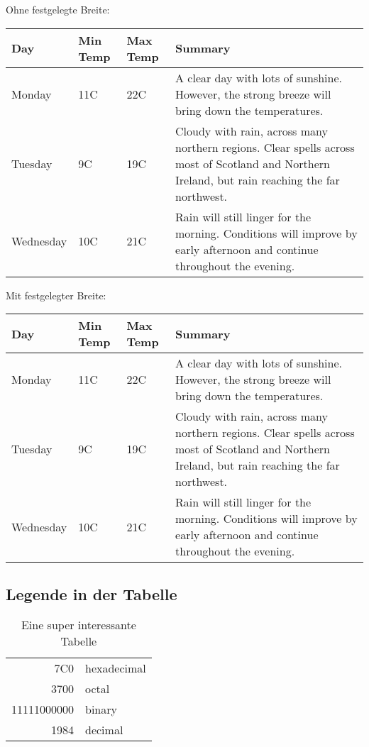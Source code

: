 \documentclass[a4paper,10pt]{scrartcl}
\begin{document}
Ohne festgelegte Breite:
\begin{center}
    \begin{tabular}{| l | l | l | l |}
    \hline
    Day & Min Temp & Max Temp & Summary \\ \hline
    Monday & 11C & 22C & A clear day with lots of sunshine.
    However, the strong breeze will bring down the temperatures. \\ \hline
    Tuesday & 9C & 19C & Cloudy with rain, across many northern regions. Clear spells
    across most of Scotland and Northern Ireland,
    but rain reaching the far northwest. \\ \hline
    Wednesday & 10C & 21C & Rain will still linger for the morning.
    Conditions will improve by early afternoon and continue
    throughout the evening. \\
    \hline
    \end{tabular}
\end{center}

Mit festgelegter Breite:
\begin{center}
    \begin{tabular}{ | l | l | l | p{5cm} |}
    \hline
    Day & Min Temp & Max Temp & Summary \\ \hline
    Monday & 11C & 22C & A clear day with lots of sunshine.  
    However, the strong breeze will bring down the temperatures. \\ \hline
    Tuesday & 9C & 19C & Cloudy with rain, across many northern regions. Clear spells
    across most of Scotland and Northern Ireland,
    but rain reaching the far northwest. \\ \hline
    Wednesday & 10C & 21C & Rain will still linger for the morning.
    Conditions will improve by early afternoon and continue
    throughout the evening. \\
    \hline
    \end{tabular}
\end{center}

\newpage
\subsection{Legende in der Tabelle}

\begin{table}[htb]
\begin{tabular}{|r|l|}
  \hline
  7C0 & hexadecimal \\
  3700 & octal \\ \cline{2-2}
  11111000000 & binary \\
  \hline \hline
  1984 & decimal \\
  \hline
\end{tabular}
\caption{Eine super interessante Tabelle}
\label{tab:supertabelle}
\end{table}
\end{document}
